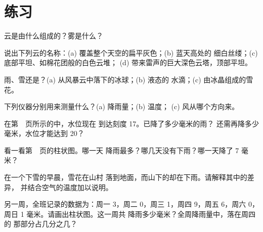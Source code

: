 \section{练习}

\begin{exercise}[$\star$]\label{exo:g4:clouds-rain-snow:1}
云是由什么组成的？雾是什么？
\end{exercise}

\begin{exercise}[$\star$]\label{exo:g4:clouds-rain-snow:2}
说出下列云的名称：(a) 覆盖整个天空的扁平灰色；(b) 蓝天高处的
细白丝缕；(c) 底部平坦、如棉花团般的白色云堆；
(d) 带来雷声的巨大深色云塔，顶部平坦。
\end{exercise}

\begin{exercise}[$\star$]\label{exo:g4:clouds-rain-snow:3}
雨、雪还是？(a) 从风暴云中落下的冰球；(b) 液态的
水滴；(c) 由冰晶组成的雪花。
\end{exercise}

\begin{exercise}[$\star$]\label{exo:g4:clouds-rain-snow:4}
下列仪器分别用来测量什么？(a) 降雨量；(b) 温度；
(c) 风从哪个方向来。
\end{exercise}

\begin{exercise}[$\star$]\label{exo:g4:clouds-rain-snow:5}
在第~\pageref{fig:g4:clouds-rain-snow:gauge}~页所示的中，水位现在
到达刻度 17。已降了多少毫米的雨？
还需再降多少毫米，水位才能达到 20？
\end{exercise}

\begin{exercise}[$\star$]\label{exo:g4:clouds-rain-snow:6}
看一看第~\pageref{fig:g4:clouds-rain-snow:bars}~页的柱状图。哪一天
降雨最多？哪几天没有下雨？哪一天降了 7
毫米？
\end{exercise}

\begin{exercise}[$\star\star$]\label{exo:g4:clouds-rain-snow:7}
在一个下雪的早晨，雪花在山村
落到地面，而山下的却在下雨。请解释其中的差异，
并结合空气的温度加以说明。
\end{exercise}

\begin{exercise}[$\star\star$]\label{exo:g4:clouds-rain-snow:8}
另一周，全班记录的数据为：周一 3，周二 0，周三 1，周四
9，周五 6，周六 0，周日 1 毫米。请画出柱状图。这一周共
降雨多少毫米？全周降雨量中，落在周四的
那部分占几分之几？
\end{exercise}

